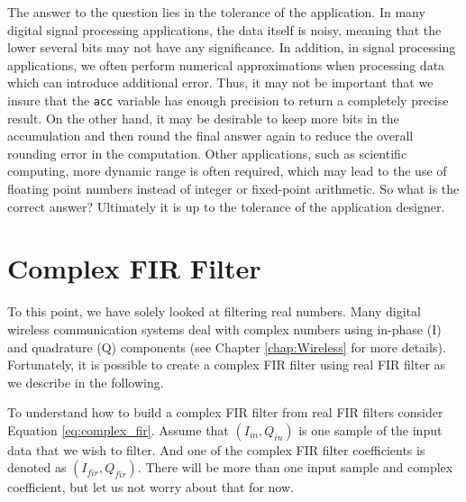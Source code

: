 The answer to the question lies in the tolerance of the application. In many digital signal processing applications, the data itself is noisy, meaning that the lower several bits may not have any significance. In addition, in signal processing applications, we often perform numerical approximations when processing data which can introduce additional error. Thus, it may not be important that we insure that the \lstinline{acc} variable has enough precision to return a completely precise result.  On the other hand, it may be desirable to keep more bits in the accumulation and then round the final answer again to reduce the overall rounding error in the computation. Other applications, such as scientific computing, more dynamic range is often required, which may lead to the use of floating point numbers instead of integer or fixed-point arithmetic. So what is the correct answer? Ultimately it is up to the tolerance of the application designer.



\section{Complex FIR Filter}


To this point, we have solely looked at filtering real numbers. Many digital wireless communication systems deal with complex numbers using in-phase (I) and quadrature (Q) components (see Chapter \ref{chap:Wireless} for more details). Fortunately, it is possible to create a complex FIR filter using real FIR filter as we describe in the following.

To understand how to build a complex FIR filter from real FIR filters consider Equation \ref{eq:complex_fir}. Assume that $(I_{in}, Q_{in})$ is one sample of the input data that we wish to filter.  And one of the complex FIR filter coefficients is denoted as $(I_{fir}, Q_{fir})$. There will be more than one input sample and complex coefficient, but let us not worry about that for now.

